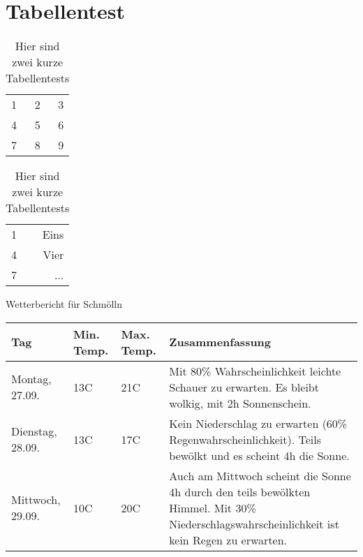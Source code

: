 \section{Tabellentest}

\begin{table} [htb]				%
\begin{tabular}{ l | c ||r }


\hline							%
1 & 2 & 3 \\
4 & 5 & 6 \\
7 & 8 & 9 \\
\hline

\end{tabular}

\begin{tabular}{| l | r |}

\hline					
1 & Eins \\
4 & Vier \\ \cline{2-2}			%
7 & ... \\
\hline \hline					%

\end{tabular}
\caption{Hier sind zwei kurze Tabellentests}	%
\label{tabellentests}			%
\end{table}

Wetterbericht für Schmölln

\begin{tabular}{| l | l | l | p{5cm} |}

\hline
Tag & Min. Temp. & Max. Temp. & Zusammenfassung \\
\hline \hline
Montag, 27.09. & 13C & 21C & Mit 80\% Wahrscheinlichkeit leichte Schauer zu erwarten. Es bleibt wolkig, mit 2h Sonnenschein. \\
\hline
Dienstag, 28.09. & 13C & 17C & Kein Niederschlag zu erwarten (60\% Regenwahrscheinlichkeit). Teils bewölkt und es scheint 4h die Sonne. \\
\hline
Mittwoch, 29.09. & 10C & 20C & Auch am Mittwoch scheint die Sonne 4h durch den teils bewölkten Himmel. Mit 30\% Niederschlagswahrscheinlichkeit ist kein Regen zu erwarten. \\
\hline

\end{tabular}

